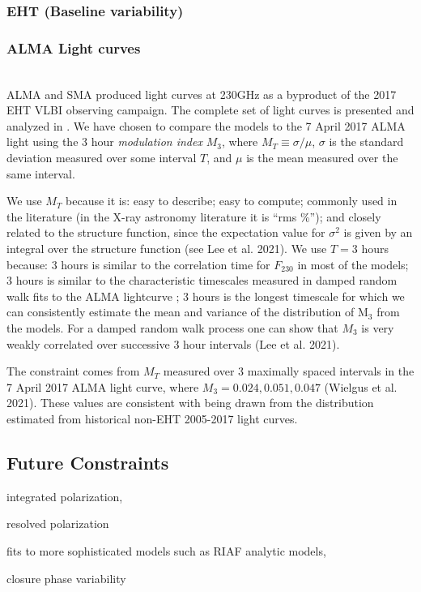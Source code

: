 \subsubsection{EHT (Baseline variability)}


\subsubsection{ALMA Light curves}
\\
ALMA and SMA produced \sgra light curves at 230GHz as a byproduct of the
2017 EHT VLBI observing campaign. The complete set of light curves is presented and analyzed in \cite{wielgus2021}. We have chosen to compare the models to the 7 April 2017 ALMA light using
the 3 hour {\em modulation index} $M_3$, where $M_T \equiv
\sigma/\mu$, $\sigma$ is the standard deviation measured over some
interval $T$, and $\mu$ is the mean measured over the same interval.

We use $M_T$ because it is: easy to describe; easy to compute;
commonly used in the literature (in the X-ray astronomy literature it
is ``rms \%''); and closely related to the structure function, since
the expectation value for $\sigma^2$ is given by an integral over the
structure function (see Lee et al. 2021).
We use $T = 3$ hours because: 3 hours is similar to the correlation
time for $F_{230}$ in most of the models; 3 hours is similar to the
characteristic timescales measured in damped random walk fits to the
ALMA lightcurve \citep[see Table 10 of][]{wielgus2021}; 3 hours is the
longest timescale for which we can consistently estimate the mean and
variance of the distribution of M$_3$ from the models.
For a damped random walk process one can show that $M_3$ is very weakly
correlated over successive 3 hour intervals (Lee et al. 2021).

The constraint comes from $M_T$ measured over 3 maximally spaced intervals
in the 7 April 2017 ALMA light curve, where $M_3 = 0.024, 0.051,
0.047$ (Wielgus et al. 2021). These values are consistent with being drawn from the distribution estimated from historical non-EHT 2005-2017 light curves.

\subsection{Future Constraints}

integrated polarization,

resolved polarization

fits to more sophisticated models such as RIAF analytic models,

closure phase variability
